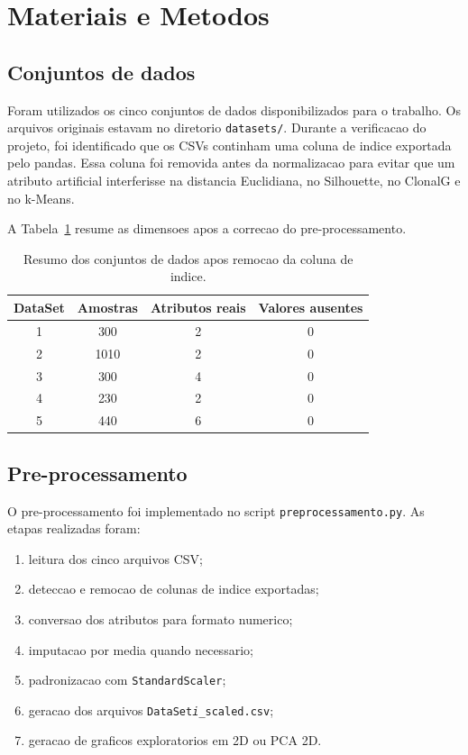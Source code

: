 \documentclass[12pt,a4paper]{article}
\begin{document}
\section{Materiais e Metodos}

\subsection{Conjuntos de dados}
Foram utilizados os cinco conjuntos de dados disponibilizados para o trabalho. Os arquivos originais estavam no diretorio \texttt{datasets/}. Durante a verificacao do projeto, foi identificado que os CSVs continham uma coluna de indice exportada pelo pandas. Essa coluna foi removida antes da normalizacao para evitar que um atributo artificial interferisse na distancia Euclidiana, no Silhouette, no ClonalG e no k-Means.

A Tabela~\ref{tab:dados} resume as dimensoes apos a correcao do pre-processamento.

\begin{table}[H]
\centering
\caption{Resumo dos conjuntos de dados apos remocao da coluna de indice.}
\label{tab:dados}
\begin{tabular}{cccc}
\toprule
DataSet & Amostras & Atributos reais & Valores ausentes \\
\midrule
1 & 300 & 2 & 0 \\
2 & 1010 & 2 & 0 \\
3 & 300 & 4 & 0 \\
4 & 230 & 2 & 0 \\
5 & 440 & 6 & 0 \\
\bottomrule
\end{tabular}
\end{table}

\subsection{Pre-processamento}
O pre-processamento foi implementado no script \texttt{preprocessamento.py}. As etapas realizadas foram:

\begin{enumerate}
    \item leitura dos cinco arquivos CSV;
    \item deteccao e remocao de colunas de indice exportadas;
    \item conversao dos atributos para formato numerico;
    \item imputacao por media quando necessario;
    \item padronizacao com \texttt{StandardScaler};
    \item geracao dos arquivos \texttt{DataSet\textit{i}\_scaled.csv};
    \item geracao de graficos exploratorios em 2D ou PCA 2D.
\end{enumerate}
\end{document}
